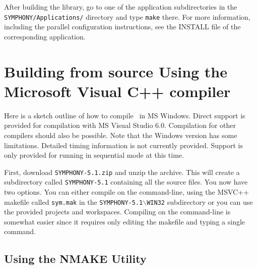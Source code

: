 After building the library, go to one of the application subdirectories in the
\texttt{SYMPHONY/Applications/} directory and type \texttt{make} there. For
more information, including the parallel configuration instructions, see the
INSTALL file of the corresponding application.

\section{Building from source Using the Microsoft Visual C++ compiler}
\label{getting_started_windows}

Here is a sketch outline of how to compile \BB\ in MS Windows. Direct support
is provided for compilation with MS Visual Studio 6.0. Compilation for other
compilers should also be possible. Note that the Windows version has some
limitations. Detailed timing information is not currently provided. Support is
only provided for running in sequential mode at this time.

First, download \texttt{SYMPHONY-5.1.zip} and unzip the archive. This will
create a subdirectory called \texttt{SYMPHONY-5.1} containing all the source
files. You now have two options. You can either compile on the command-line,
using the MSVC++ makefile called
\texttt{sym.mak} in the \texttt{SYMPHONY-5.1$\backslash$WIN32} subdirectory or 
you can use the provided projects and workspaces. Compiling on the command-line 
is somewhat easier since it requires only editing the makefile and typing a
single command.

\subsection{Using the NMAKE Utility}
\label{using_nmake}

